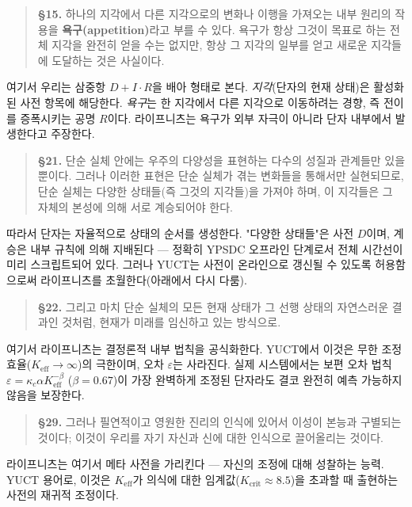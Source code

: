\documentclass[12pt,a4paper]{article}
\begin{document}
	\begin{quote}
		\textbf{§15.} 하나의 지각에서 다른 지각으로의 변화나 이행을 가져오는 내부 원리의 작용을 \textbf{욕구(appetition)}라고 부를 수 있다. 욕구가 항상 그것이 목표로 하는 전체 지각을 완전히 얻을 수는 없지만, 항상 그 지각의 일부를 얻고 새로운 지각들에 도달하는 것은 사실이다.
	\end{quote}
	
	여기서 우리는 삼중항 \(D+I\cdot R\)을 배아 형태로 본다. \emph{지각}(단자의 현재 상태)은 활성화된 사전 항목에 해당한다. \emph{욕구}는 한 지각에서 다른 지각으로 이동하려는 경향, 즉 전이를 증폭시키는 공명 \(R\)이다. 라이프니츠는 욕구가 외부 자극이 아니라 단자 내부에서 발생한다고 주장한다.
	
	\begin{quote}
		\textbf{§21.} 단순 실체 안에는 우주의 다양성을 표현하는 다수의 성질과 관계들만 있을 뿐이다. 그러나 이러한 표현은 단순 실체가 겪는 변화들을 통해서만 실현되므로, 단순 실체는 다양한 상태들(즉 그것의 지각들)을 가져야 하며, 이 지각들은 그 자체의 본성에 의해 서로 계승되어야 한다.
	\end{quote}
	
	따라서 단자는 자율적으로 상태의 순서를 생성한다. "다양한 상태들"은 사전 \(D\)이며, 계승은 내부 규칙에 의해 지배된다 — 정확히 YPSDC 오프라인 단계로서 전체 시간선이 미리 스크립트되어 있다. 그러나 YUCT는 사전이 온라인으로 갱신될 수 있도록 허용함으로써 라이프니츠를 초월한다(아래에서 다시 다룸).
	
	\begin{quote}
		\textbf{§22.} 그리고 마치 단순 실체의 모든 현재 상태가 그 선행 상태의 자연스러운 결과인 것처럼, 현재가 미래를 임신하고 있는 방식으로.
	\end{quote}
	
	여기서 라이프니츠는 결정론적 내부 법칙을 공식화한다. YUCT에서 이것은 무한 조정 효율(\(K_{\mathrm{eff}} \to \infty\))의 극한이며, 오차 \(\varepsilon\)는 사라진다. 실제 시스템에서는 보편 오차 법칙 \(\varepsilon = \kappa_c \alpha K_{\mathrm{eff}}^{-\beta}\) (\(\beta=0.67\))이 가장 완벽하게 조정된 단자라도 결코 완전히 예측 가능하지 않음을 보장한다.
	
	\begin{quote}
		\textbf{§29.} 그러나 필연적이고 영원한 진리의 인식에 있어서 이성이 본능과 구별되는 것이다; 이것이 우리를 자기 자신과 신에 대한 인식으로 끌어올리는 것이다.
	\end{quote}
	
	라이프니츠는 여기서 메타 사전을 가리킨다 — 자신의 조정에 대해 성찰하는 능력. YUCT 용어로, 이것은 \(K_{\mathrm{eff}}\)가 의식에 대한 임계값(\(K_{\mathrm{crit}} \approx 8.5\))을 초과할 때 출현하는 사전의 재귀적 조정이다.
	
\end{document}
